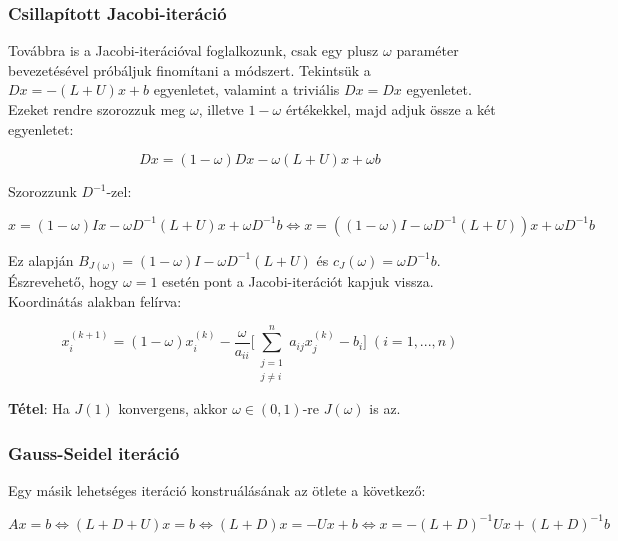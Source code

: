 \documentclass[margin=0px]{article}
\begin{document}
\subsubsection{Csillapított Jacobi-iteráció}

Továbbra is a Jacobi-iterációval foglalkozunk, csak egy plusz $\omega$ paraméter bevezetésével próbáljuk
finomítani a módszert. Tekintsük a  $Dx = -(L + U)x + b$ egyenletet, valamint a triviális $Dx =
    Dx$ egyenletet. Ezeket rendre szorozzuk meg $\omega$, illetve $1 - \omega$ értékekkel, majd adjuk össze a két
egyenletet:

\begin{displaymath}
    Dx = (1 - \omega)Dx -\omega(L+U)x + \omega b
\end{displaymath}

\noindent Szorozzunk $D^{-1}$-zel:

\begin{displaymath}
    x = (1 - \omega)Ix -\omega D^{-1}(L+U)x + \omega D^{-1}b \Longleftrightarrow
    x = ((1 - \omega)I -\omega D^{-1}(L+U))x + \omega D^{-1}b
\end{displaymath}

\noindent Ez alapján $B_{J(\omega)} = (1 - \omega)I -\omega D^{-1}(L+U)$ és $c_{J}(\omega) = \omega D^{-1}b$.\\

\noindent Észrevehető, hogy $\omega = 1$ esetén pont a Jacobi-iterációt kapjuk vissza.\\

\noindent Koordinátás alakban felírva:

\begin{displaymath}
    x^{(k+1)}_{i} =
    (1 - \omega)x^{(k)}_{i}
    -\frac{\omega}{a_{ii}}
    \Bigg[
    \sum_{\substack{j=1\\ j \not = i}}^{n} a_{ij}x_{j}^{(k)} - b_{i}
    \Bigg]
    \; (i = 1, ..., n)
\end{displaymath}

\noindent \textbf{Tétel}: Ha $J(1)$ konvergens, akkor $\omega \in (0,1)$-re $J(\omega)$ is az.

\subsubsection{Gauss-Seidel iteráció}

\noindent Egy másik lehetséges iteráció konstruálásának az ötlete a következő:

\begin{displaymath}
    Ax = b \Longleftrightarrow (L + D + U)x = b \Longleftrightarrow (L+D)x = -Ux+b \Longleftrightarrow
    x = -(L+D)^{-1}Ux + (L+D)^{-1}b
\end{displaymath}
\end{document}
